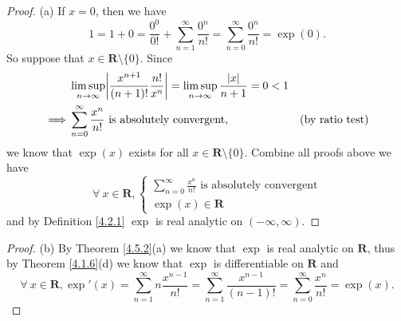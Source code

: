 \begin{proof}{(a)}
    If \(x = 0\), then we have
    \[
        1 = 1 + 0 = \frac{0^0}{0!} + \sum_{n = 1}^\infty \frac{0^n}{n!} = \sum_{n = 0}^\infty \frac{0^n}{n!} = \exp(0).
    \]
    So suppose that \(x \in \mathbf{R} \setminus \{0\}\).
    Since
    \begin{align*}
                 & \limsup_{n \to \infty} \abs*{\frac{x^{n + 1}}{(n + 1)!} \frac{n!}{x^n}} = \limsup_{n \to \infty} \frac{\abs*{x}}{n + 1} = 0 < 1                          \\
        \implies & \sum_{n = 0}^\infty \frac{x^n}{n!} \text{ is absolutely convergent},                                                            & \text{(by ratio test)}
    \end{align*}
    we know that \(\exp(x)\) exists for all \(x \in \mathbf{R} \setminus \{0\}\).
    Combine all proofs above we have
    \[
        \forall\ x \in \mathbf{R}, \begin{cases}
            \sum_{n = 0}^\infty \frac{x^n}{n!} \text{ is absolutely convergent} \\
            \exp(x) \in \mathbf{R}
        \end{cases}
    \]
    and by Definition \ref{4.2.1} \(\exp\) is real analytic on \((-\infty, \infty)\).
\end{proof}

\begin{proof}{(b)}
    By Theorem \ref{4.5.2}(a) we know that \(\exp\) is real analytic on \(\mathbf{R}\), thus by Theorem \ref{4.1.6}(d) we know that \(\exp\) is differentiable on \(\mathbf{R}\) and
    \[
        \forall\ x \in \mathbf{R}, \exp'(x) = \sum_{n = 1}^\infty n \frac{x^{n - 1}}{n!} = \sum_{n = 1}^\infty \frac{x^{n - 1}}{(n - 1)!} = \sum_{n = 0}^\infty \frac{x^n}{n!} = \exp(x).
    \]
\end{proof}

